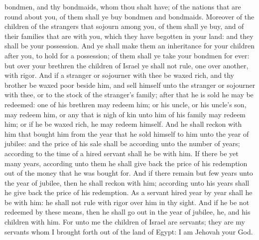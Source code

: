 bondmen, and thy bondmaids, whom thou shalt have; of the nations that are round about you, of them shall ye buy bondmen and bondmaids. Moreover of the children of the strangers that sojourn among you, of them shall ye buy, and of their families that are with you, which they have begotten in your land: and they shall be your possession. And ye shall make them an inheritance for your children after you, to hold for a possession; of them shall ye take your bondmen for ever: but over your brethren the children of Israel ye shall not rule, one over another, with rigor.  And if a stranger or sojourner with thee be waxed rich, and thy brother be waxed poor beside him, and sell himself unto the stranger or sojourner with thee, or to the stock of the stranger’s family; after that he is sold he may be redeemed: one of his brethren may redeem him; or his uncle, or his uncle’s son, may redeem him, or any that is nigh of kin unto him of his family may redeem him; or if he be waxed rich, he may redeem himself. And he shall reckon with him that bought him from the year that he sold himself to him unto the year of jubilee: and the price of his sale shall be according unto the number of years; according to the time of a hired servant shall he be with him. If there be yet many years, according unto them he shall give back the price of his redemption out of the money that he was bought for. And if there remain but few years unto the year of jubilee, then he shall reckon with him; according unto his years shall he give back the price of his redemption. As a servant hired year by year shall he be with him: he shall not rule with rigor over him in thy sight. And if he be not redeemed by these means, then he shall go out in the year of jubilee, he, and his children with him. For unto me the children of Israel are servants; they are my servants whom I brought forth out of the land of Egypt: I am Jehovah your God. 

